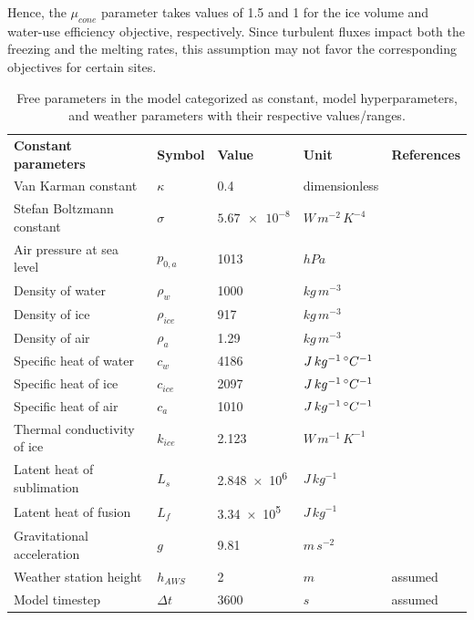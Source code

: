 \documentclass[tc, manuscript]{copernicus}
\begin{document}
Hence, the $\mu_{cone}$ parameter takes values of 1.5 and 1 for the ice volume and water-use efficiency
objective, respectively.  Since turbulent fluxes impact both the freezing and the melting rates, this assumption
may not favor the corresponding objectives for certain sites.

\appendixtables   

\begin{table}
  \caption{Free parameters in the model categorized as constant, model hyperparameters, and weather 
  parameters with their respective values/ranges.}

	\label{tab:parameters}
	\begin{tabular}{lllll}
		\toprule

		\textbf{Constant parameters}                       & \textbf{Symbol} & \textbf{Value} &
    \textbf{Unit} & \textbf{References} \\
    Van Karman constant & $\kappa$      & 0.4        &dimensionless & \citet{cuffeyPhysicsGlaciers2010}              \\
    Stefan Boltzmann constant & $\sigma$ & $\num{5.67 e-8} $& $W\, m^{-2}\, K^{-4}$ & \citet{cuffeyPhysicsGlaciers2010}\\
    Air pressure at sea level & $p_{0,a}$ & 1013 & $hPa$  & \citet{molgAblationAssociatedEnergy2004}\\
    Density of water & $\rho_{w}$ & 1000 & $kg\, m^{-3}$    & \citet{cuffeyPhysicsGlaciers2010}\\
    Density of ice & $\rho_{ice}$ & 917 & $kg\, m^{-3}$ & \citet{cuffeyPhysicsGlaciers2010}\\
    Density of air & $\rho_{a}$ &  1.29 & $kg\, m^{-3}$   & \citet{molgAblationAssociatedEnergy2004}\\
    Specific heat of water & $c_{w}$ & 4186 & $J\, kg^{-1}\,^{\circ} C^{-1}$  & \citet{cuffeyPhysicsGlaciers2010}\\
    Specific heat of ice & $c_{ice}$ & 2097 & $J\, kg^{-1}\,^{\circ} C^{-1}$ & \citet{cuffeyPhysicsGlaciers2010}\\
    Specific heat of air & $c_{a}$ & 1010 & $J\, kg^{-1}\,^{\circ} C^{-1}$ & \citet{molgAblationAssociatedEnergy2004}\\
    Thermal conductivity of ice & $k_{ice}$ & 2.123  & $W\, m^{-1}\, K^{-1}$ & \citet{bonalesThermalConductivityIce2017} \\
    Latent heat of sublimation & $L_{s}$ & \num{2.848e6}  & $J\, kg^{-1}$ &   \citet{cuffeyPhysicsGlaciers2010}\\
    Latent heat of fusion & $L_{f}$ & \num{3.34e5} & $J\, kg^{-1}$ & \citet{cuffeyPhysicsGlaciers2010}\\
    Gravitational acceleration & $g$ & 9.81 & $m\, s^{-2}$ &\citet{cuffeyPhysicsGlaciers2010}\\
    Weather station height & $h_{AWS}$ & 2 & $m$ & assumed \\
    Model timestep                            & $\Delta t$            & $3600$           & $s$ & assumed \\\midrule


\end{tabular}
\end{table}
\end{document}
